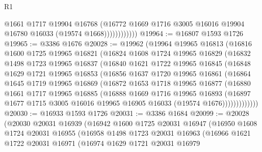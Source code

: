 \begin{lexlean}{R1}
\begin{coremodule}
                        @1661
                        @1717
                        @19904
                        @16768
                        (@16772
                          @1669
                          @1716
                          @3005
                          @16016
                          @19904
                          @16780
                          @16033
                          (@19574 @1668))))))))))))
@19964 := @16807 @1593 @1726
@19965 := @3386 @1676
@20028 := @19962
    (@19964
      @19965
      @16813
      (@16816
        @1600
        @1725
        @19965
        @16821
        (@16824
          @1608
          @1724
          @19965
          @16829
          (@16832
            @1498
            @1723
            @19965
            @16837
            (@16840
              @1621
              @1722
              @19965
              @16845
              (@16848
                @1629
                @1721
                @19965
                @16853
                (@16856
                  @1637
                  @1720
                  @19965
                  @16861
                  (@16864
                    @1645
                    @1719
                    @19965
                    @16869
                    (@16872
                      @1653
                      @1718
                      @19965
                      @16877
                      (@16880
                        @1661
                        @1717
                        @19965
                        @16885
                        (@16888
                          @1669
                          @1716
                          @19965
                          @16893
                          (@16897
                            @1677
                            @1715
                            @3005
                            @16016
                            @19965
                            @16905
                            @16033
                            (@19574 @1676)))))))))))))
@20030 := @16933 @1593 @1726
@20031 := @3386 @1684
@20099 := @20028
    (@20030
      @20031
      @16939
      (@16942
        @1600
        @1725
        @20031
        @16947
        (@16950
          @1608
          @1724
          @20031
          @16955
          (@16958
            @1498
            @1723
            @20031
            @16963
            (@16966
              @1621
              @1722
              @20031
              @16971
              (@16974
                @1629
                @1721
                @20031
                @16979

\end{coremodule}
\end{lexlean}
